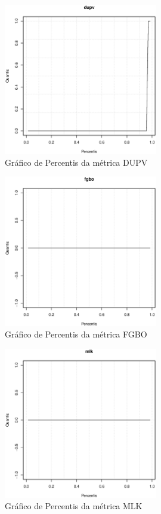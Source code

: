 \begin{anexosenv}
\begin{figure}[h]
  \centering
  \includegraphics[width=0.6\textwidth]
      {dados/linux/dupv.eps}
  \caption{Gráfico de Percentis da métrica DUPV}
  \label{graphic:dupv}
\end{figure}

\newpage

\begin{figure}[h]
  \centering
  \includegraphics[width=0.6\textwidth]
      {dados/linux/fgbo.eps}
  \caption{Gráfico de Percentis da métrica FGBO}
\end{figure}

\begin{figure}[h]
  \centering
  \includegraphics[width=0.6\textwidth]
      {dados/linux/mlk.eps}
  \caption{Gráfico de Percentis da métrica MLK}
\end{figure}


\end{anexosenv}
